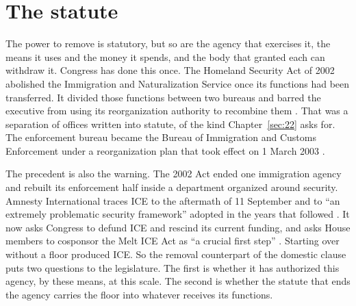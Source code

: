 \section{The statute}
\label{sec:8.4}
The power to remove is statutory, but so are the agency that exercises it, the means it uses and the money it spends, and the body that granted each can withdraw it. Congress has done this once. The Homeland Security Act of 2002 abolished the Immigration and Naturalization Service once its functions had been transferred. It divided those functions between two bureaus and barred the executive from using its reorganization authority to recombine them \autocite[§§442, 451, 471]{hsa2002}. That was a separation of offices written into statute, of the kind Chapter~\ref{sec:22} asks for. The enforcement bureau became the Bureau of Immigration and Customs Enforcement under a reorganization plan that took effect on 1 March 2003 \autocite{hdoc108_32}.

The precedent is also the warning. The 2002 Act ended one immigration agency and rebuilt its enforcement half inside a department organized around security. Amnesty International traces ICE to the aftermath of 11 September and to “an extremely problematic security framework” adopted in the years that followed \autocite{Amnesty2026PressRelease}. It now asks Congress to defund ICE and rescind its current funding, and asks House members to cosponsor the Melt ICE Act as “a crucial first step” \autocite{AmnestyUSA2026Letter}. Starting over without a floor produced ICE. So the removal counterpart of the domestic clause puts two questions to the legislature. The first is whether it has authorized this agency, by these means, at this scale. The second is whether the statute that ends the agency carries the floor into whatever receives its functions.
